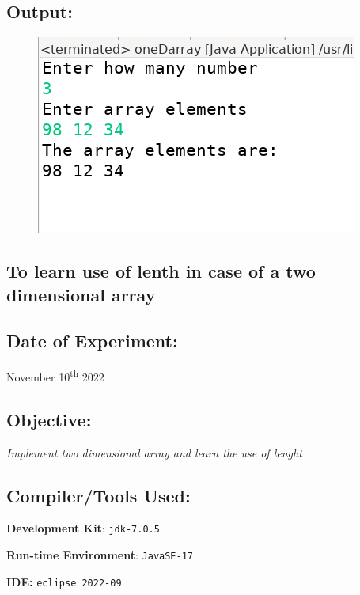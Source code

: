 \documentclass[12pt, a4paper]{article}
\begin{document}
\subsection*{Output:}
\begin{figure}[h]
  \centering
  \includegraphics[width=\textwidth]{oneDarray}
\end{figure}
\newpage

\begin{tcolorbox}
\section{To learn use of lenth in case of a two dimensional array}
\end{tcolorbox}
\subsection*{Date of Experiment:}
November 10\textsuperscript{th} 2022

\subsection*{Objective:}
\emph{\large{Implement two dimensional array and learn the use of lenght}}

\subsection*{Compiler/Tools Used:}
\textbf{Development Kit}: \verb+jdk-7.0.5+

\textbf{Run-time Environment}: \verb+JavaSE-17+

\textbf{IDE:} \verb+eclipse 2022-09+
\end{document}
